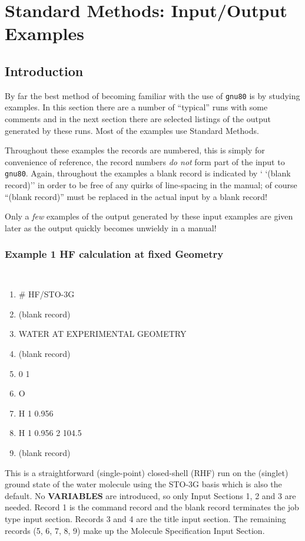 \chapter{\sf Standard Methods: Input/Output Examples}
\label{app2a}
\section{\sf Introduction}
\label{inex}
By far the best method of becoming familiar with the use
of {\tt gnu80} is by studying examples. In this section there
are a number of ``typical'' runs with some comments
and in the next section there are selected listings of the
output generated by these runs. Most of the examples use
Standard Methods. 

Throughout these examples the records are numbered,
this is simply for convenience of reference, the record numbers
{\em do not} form part of the input to {\tt gnu80}. Again, throughout
the examples a blank record is indicated by ` `(blank record)'' 
in order
to be free of any quirks of line-spacing in the manual; of course
``(blank record)'' must be replaced in the actual input
by a blank record!

Only a {\em few} examples of the output generated by these input
examples are given later as the output quickly becomes unwieldy
in a manual!

\newpage
\subsection{\sf Example 1 HF calculation at fixed Geometry}
{\tt 
\begin{enumerate}
\item \# HF/STO-3G
\item (blank record)
\item  WATER AT EXPERIMENTAL GEOMETRY
\item (blank record)
\item 0 1
\item O
\item H 1 0.956
\item H 1 0.956 2 104.5
\item (blank record)
\end{enumerate}
}
This is a straightforward (single-point) 
closed-shell (RHF) run on the (singlet) ground state
of the water molecule using the STO-3G basis which is also the default.  
No {\bf VARIABLES} are
introduced, so only Input Sections 1, 2 and 3 are needed.
Record 1 is the command record and the blank record
terminates  the job type input section.  Records 3 and 4 are
the title input section.  The remaining records (5, 6, 7, 8, 9) make up the
Molecule Specification Input Section. 
